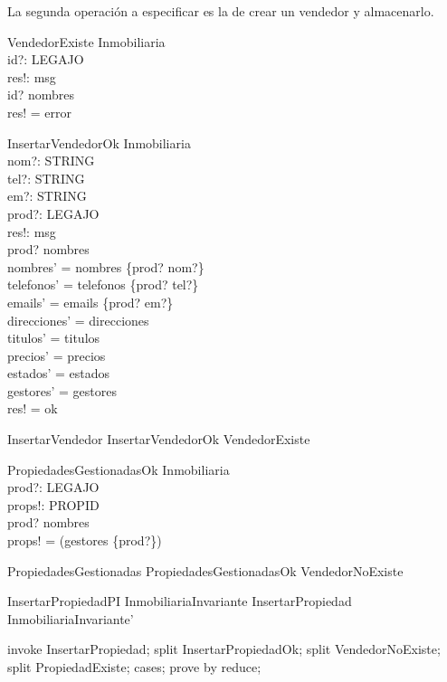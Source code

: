 La segunda operación a especificar es la de crear un vendedor y almacenarlo.

\begin{schema}{VendedorExiste}
\Xi Inmobiliaria \\
id?: LEGAJO \\
res!: msg \\
\where
id? \in \dom nombres \\
res! = error \\
\end{schema}

\begin{schema}{InsertarVendedorOk}
\Delta Inmobiliaria \\
nom?: STRING \\
tel?: STRING \\
em?: STRING \\
prod?: LEGAJO \\
res!: msg \\
\where
prod? \notin \dom nombres \\

nombres' =  nombres \cup \{prod? \mapsto nom?\}  \\
telefonos' =  telefonos \cup \{prod? \mapsto tel?\}  \\
emails' =  emails \cup \{prod? \mapsto em?\}  \\

direcciones' =  direcciones\\
titulos' = titulos\\
precios' = precios\\
estados' = estados\\
gestores' = gestores\\

res! = ok \\
\end{schema}

\begin{zed}
InsertarVendedor  InsertarVendedorOk \lor VendedorExiste
\end{zed}

\begin{schema}{PropiedadesGestionadasOk}
\Xi Inmobiliaria \\
prod?: LEGAJO \\
props!: \power PROPID \\
\where
prod? \in \dom nombres \\
props! = \dom(gestores \rres \{prod?\})
\end{schema}

\begin{zed}
PropiedadesGestionadas  PropiedadesGestionadasOk \lor VendedorNoExiste
\end{zed}

\begin{theorem}{InsertarPropiedadPI}
InmobiliariaInvariante \land InsertarPropiedad \implies InmobiliariaInvariante'
\end{theorem}

\begin{zproof}[InsertarPropiedadPI]
invoke InsertarPropiedad;
split InsertarPropiedadOk;
split VendedorNoExiste;
split PropiedadExiste;
cases;
prove by reduce;
\end{zproof}